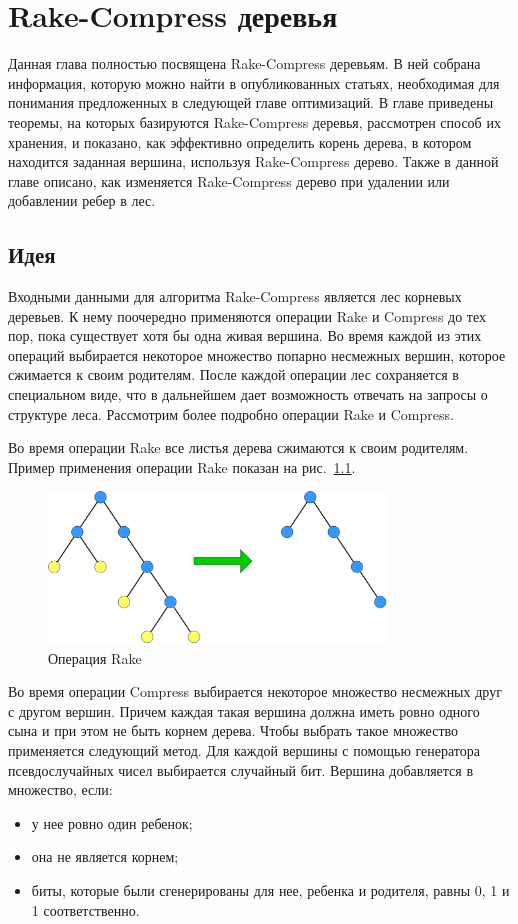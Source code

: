 
\chapter{Rake-Compress деревья}

Данная глава полностью посвящена Rake-Compress деревьям. 
В ней собрана информация, которую можно найти в опубликованных статьях, необходимая для понимания предложенных в следующей главе оптимизаций.
В главе приведены теоремы, на которых базируются Rake-Compress деревья, 
рассмотрен способ их хранения, 
и показано, как эффективно определить корень дерева, в котором находится заданная вершина, используя Rake-Compress дерево.
Также в данной главе описано, как изменяется Rake-Compress дерево при удалении или добавлении ребер в лес.

\FloatBarrier
\section{Идея}

Входными данными для алгоритма Rake-Compress является лес корневых деревьев. К нему поочередно применяются операции Rake и Compress до тех пор, пока существует хотя бы одна живая вершина. 
Во время каждой из этих операций выбирается некоторое множество попарно несмежных вершин, которое сжимается к своим родителям. 
После каждой операции лес сохраняется в специальном виде, что в дальнейшем дает возможность отвечать на запросы о структуре леса. Рассмотрим более подробно операции Rake и Compress.

Во время операции Rake все листья дерева сжимаются к своим родителям. Пример применения операции Rake показан на рис.~\ref{pic:rake}.

\begin{figure}[h]
\centering
\includegraphics[width=0.8\textwidth]{pics/rake.png}
\caption{Операция Rake}
\label{pic:rake}
\end{figure}

Во время операции Compress выбирается некоторое множество несмежных друг с другом вершин.
Причем каждая такая вершина должна иметь ровно одного сына и при этом не быть корнем дерева. Чтобы выбрать такое множество применяется следующий метод.
Для каждой вершины с помощью генератора псевдослучайных чисел выбирается случайный бит. Вершина добавляется в множество, если:
\begin{itemize}
\item у нее ровно один ребенок;
\item она не является корнем;
\item биты, которые были сгенерированы для нее, ребенка и родителя, равны 0, 1 и 1 соответственно. 
\end{itemize}

